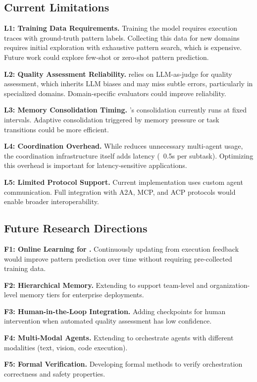 \documentclass{article}
\theoremstyle{plain}
\theoremstyle{definition}
\theoremstyle{remark}
\begin{document}
\subsection{Current Limitations}

\textbf{L1: \car{} Training Data Requirements.}
Training the \car{} model requires execution traces with ground-truth pattern labels. Collecting this data for new domains requires initial exploration with exhaustive pattern search, which is expensive. Future work could explore few-shot or zero-shot pattern prediction.

\textbf{L2: Quality Assessment Reliability.}
\rcm{} relies on LLM-as-judge for quality assessment, which inherits LLM biases and may miss subtle errors, particularly in specialized domains. Domain-specific evaluators could improve reliability.

\textbf{L3: Memory Consolidation Timing.}
\uma{}'s consolidation currently runs at fixed intervals. Adaptive consolidation triggered by memory pressure or task transitions could be more efficient.

\textbf{L4: Coordination Overhead.}
While \amore{} reduces unnecessary multi-agent usage, the coordination infrastructure itself adds latency (~0.5s per subtask). Optimizing this overhead is important for latency-sensitive applications.

\textbf{L5: Limited Protocol Support.}
Current implementation uses custom agent communication. Full integration with A2A, MCP, and ACP protocols would enable broader interoperability.

\subsection{Future Research Directions}

\textbf{F1: Online Learning for \car{}.}
Continuously updating \car{} from execution feedback would improve pattern prediction over time without requiring pre-collected training data.

\textbf{F2: Hierarchical Memory.}
Extending \uma{} to support team-level and organization-level memory tiers for enterprise deployments.

\textbf{F3: Human-in-the-Loop Integration.}
Adding checkpoints for human intervention when automated quality assessment has low confidence.

\textbf{F4: Multi-Modal Agents.}
Extending \amore{} to orchestrate agents with different modalities (text, vision, code execution).

\textbf{F5: Formal Verification.}
Developing formal methods to verify orchestration correctness and safety properties.
\end{document}
